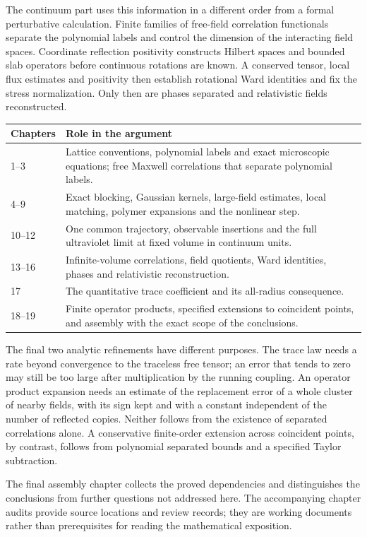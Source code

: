 The continuum part uses this information in a different order from a
formal perturbative calculation. Finite families of free-field correlation functionals separate the
polynomial labels and control the dimension of the interacting field spaces. Coordinate
reflection positivity constructs Hilbert spaces and bounded slab
operators before continuous rotations are known. A conserved tensor,
local flux estimates and positivity then establish rotational Ward
identities and fix the stress normalization. Only then are phases
separated and relativistic fields reconstructed.

\begin{center}
\begin{tabular}{@{}p{}p{}@{}}
\toprule
Chapters & Role in the argument\\
\midrule
1--3 & Lattice conventions, polynomial labels and exact microscopic equations;
free Maxwell correlations that separate polynomial labels.\\[5pt]
4--9 & Exact blocking, Gaussian kernels, large-field estimates,
local matching, polymer expansions and the nonlinear step.\\[5pt]
10--12 & One common trajectory, observable insertions and the full
ultraviolet limit at fixed volume in continuum units.\\[5pt]
13--16 & Infinite-volume correlations, field quotients, Ward identities,
phases and relativistic reconstruction.\\[5pt]
17 & The quantitative trace coefficient and its all-radius consequence.\\[5pt]
18--19 & Finite operator products, specified extensions to coincident points,
and assembly with the exact scope of the conclusions.\\
\bottomrule
\end{tabular}
\end{center}

The final two analytic refinements have different purposes. The trace
law needs a rate beyond convergence to the traceless free tensor; an
error that tends to zero may still be too large after multiplication by
the running coupling. An operator product expansion needs an estimate of the
replacement error of a whole cluster of nearby fields, with its sign kept and with a constant independent of the number of reflected copies.
Neither follows from the existence of separated correlations alone.
A conservative finite-order extension across coincident points,
by contrast, follows from polynomial separated bounds and a specified
Taylor subtraction.

The final assembly chapter collects the proved dependencies and
distinguishes the conclusions from further questions not addressed here. The
accompanying chapter audits provide source locations and review records;
they are working documents rather than prerequisites for reading the
mathematical exposition.

